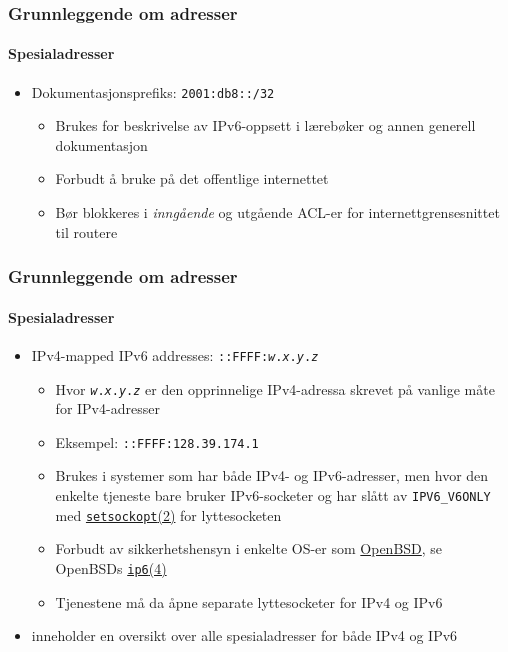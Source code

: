 \begin{frame}%
  \frametitle{Grunnleggende om adresser}
  \framesubtitle{Spesialadresser}
  \begin{itemize}[<+->]
  \item Dokumentasjonsprefiks: \texttt{2001:db8::/32}
    \begin{itemize}[<+->]
    \item Brukes for beskrivelse av IPv6-oppsett i lærebøker og annen
      generell dokumentasjon 
    \item Forbudt å bruke på det offentlige internettet
    \item Bør blokkeres i \textit{inngående\/} og utgående ACL-er for
      internettgrensesnittet til routere
    \end{itemize}
  \end{itemize}
\end{frame}

\begin{frame}%
  \frametitle{Grunnleggende om adresser}
  \framesubtitle{Spesialadresser}
  \begin{itemize}[<+->]
  \item IPv4-mapped IPv6 addresses:
    \texttt{::FFFF:\textit{w}.\textit{x}.\textit{y}.\textit{z}}
    \begin{itemize}[<+->]
    \item Hvor \texttt{\textit{w}.\textit{x}.\textit{y}.\textit{z}} er
      den opprinnelige IPv4-adressa skrevet på vanlige måte for IPv4-adresser
    \item Eksempel: \texttt{::FFFF:128.39.174.1}
    \item Brukes i systemer som har både IPv4- og IPv6-adresser, men
      hvor den enkelte tjeneste bare bruker IPv6-socketer og har slått
      av \texttt{IPV6\_V6ONLY} med
      \href{http://www.freebsd.org/cgi/man.cgi?query=setsockopt&apropos=0&sektion=2&manpath=FreeBSD+9.1-RELEASE&arch=default&format=html}{\texttt{setsockopt}(2)}
      for lyttesocketen
    \item Forbudt av sikkerhetshensyn i enkelte OS-er som
      \href{http://www.openbsd.org/}{OpenBSD}, se OpenBSDs
      \href{http://www.openbsd.org/cgi-bin/man.cgi?query=ip6&sektion=4}{\texttt{ip6}(4)}
    \item Tjenestene må da åpne separate lyttesocketer for IPv4 og
      IPv6
    \end{itemize}
  \item {} inneholder en oversikt over alle spesialadresser
    for både IPv4 og IPv6
  \end{itemize}
\end{frame}

